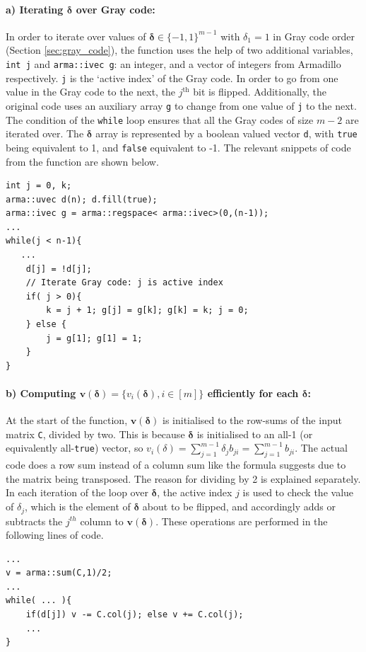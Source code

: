 \documentclass[ %
                    author={Manan Vaswani},
                supervisor={Dr. Raphael Clifford},
                    degree={MEng},
                     title={A multi-core CPU implementation of the classical Boson Sampling algorithm},
                  subtitle={},
                      type={},
                      year={2019} ]{dissertation}
\theoremstyle{plain}
\theoremstyle{definition}
\begin{document}
\paragraph{a) Iterating $\mathbf{\delta}$ over Gray code:} In order to iterate over values of $\mathbf{\delta} \in \{-1, 1\}^{m-1}$ with $\delta_1 = 1$ in Gray code order (Section \ref{sec:gray_code}), the function uses the help of two additional variables, \texttt{int j} and \texttt{arma::ivec g}: an integer, and a vector of integers from Armadillo respectively. \texttt{j} is the `active index' of the Gray code. In order to go from one value in the Gray code to the next, the $j^\text{th}$ bit is flipped. Additionally, the original code uses an auxiliary array \texttt{g} to change from one value of  \texttt{j} to the next. The condition of the \texttt{while} loop ensures that all the Gray codes of size $m-2$ are iterated over. The $\mathbf{\delta}$ array is represented by a boolean valued vector \texttt{d}, with \texttt{true} being equivalent to 1, and \texttt{false} equivalent to -1.
The relevant snippets of code from the function are shown below.
\begin{verbatim}
int j = 0, k;
arma::uvec d(n); d.fill(true);
arma::ivec g = arma::regspace< arma::ivec>(0,(n-1));
...
while(j < n-1){
   ...
    d[j] = !d[j];
    // Iterate Gray code: j is active index
    if( j > 0){
        k = j + 1; g[j] = g[k]; g[k] = k; j = 0;
    } else {
        j = g[1]; g[1] = 1;
    }
}
\end{verbatim}

\paragraph{b) Computing $\mathbf{v}(\mathbf{\delta}) = \{v_i (\mathbf{\delta}), i \in [m]\}$ efficiently for each $\mathbf{\delta}$:} At the start of the function, $\mathbf{v}(\mathbf{\delta})$ is initialised to the row-sums of the input matrix \texttt{C}, divided by two. This is because $\mathbf{\delta}$ is initialised to an all-1 (or equivalently all-\texttt{true}) vector, so $v_i (\delta) = \sum_{j=1}^{m-1} \delta_j b_{ji} =  \sum_{j=1}^{m-1} b_{ji}$. The actual code does a row sum instead of a column sum like the formula suggests due to the matrix being transposed. The reason for dividing by 2 is explained separately. In each iteration of the loop over $\mathbf{\delta}$, the active index $j$ is used to check the value of $\delta_j$, which is the element of $\mathbf{\delta}$ about to be flipped, and accordingly adds or subtracts the $j^{th}$ column to $\mathbf{v}(\mathbf{\delta})$. These operations are performed in the following lines of code.
\begin{verbatim}
...
v = arma::sum(C,1)/2;
...
while( ... ){
    if(d[j]) v -= C.col(j); else v += C.col(j);
    ...
}
\end{verbatim}
\end{document}
